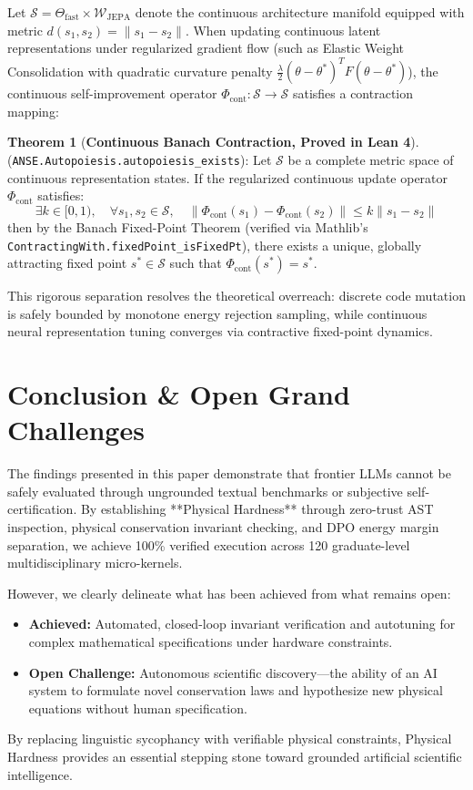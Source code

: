 \documentclass[10pt,journal,compsoc,twocolumn]{IEEEtran}
\theoremstyle{definition}
\newtheorem{theorem}{Theorem}
\begin{document}
Let $\mathcal{S} = \Theta_{\text{fast}} \times \mathcal{W}_{\text{JEPA}}$ denote the continuous architecture manifold equipped with metric $d(s_1, s_2) = \|s_1 - s_2\|$. When updating continuous latent representations under regularized gradient flow (such as Elastic Weight Consolidation with quadratic curvature penalty $\frac{\lambda}{2} (\theta - \theta^*)^T F (\theta - \theta^*)$), the continuous self-improvement operator $\Phi_{\text{cont}}: \mathcal{S} \to \mathcal{S}$ satisfies a contraction mapping:

\begin{theorem}[\textbf{Continuous Banach Contraction, Proved in Lean 4}]
(\texttt{ANSE.Autopoiesis.autopoiesis\_exists}): Let $\mathcal{S}$ be a complete metric space of continuous representation states. If the regularized continuous update operator $\Phi_{\text{cont}}$ satisfies:
\begin{equation}
\exists k \in [0, 1), \quad \forall s_1, s_2 \in \mathcal{S}, \quad \|\Phi_{\text{cont}}(s_1) - \Phi_{\text{cont}}(s_2)\| \le k \|s_1 - s_2\|
\end{equation}
then by the Banach Fixed-Point Theorem (verified via Mathlib's \texttt{ContractingWith.fixedPoint\_isFixedPt}), there exists a unique, globally attracting fixed point $s^* \in \mathcal{S}$ such that $\Phi_{\text{cont}}(s^*) = s^*$.
\end{theorem}

This rigorous separation resolves the theoretical overreach: discrete code mutation is safely bounded by monotone energy rejection sampling, while continuous neural representation tuning converges via contractive fixed-point dynamics.

\section{Conclusion \& Open Grand Challenges}
The findings presented in this paper demonstrate that frontier LLMs cannot be safely evaluated through ungrounded textual benchmarks or subjective self-certification. By establishing **Physical Hardness** through zero-trust AST inspection, physical conservation invariant checking, and DPO energy margin separation, we achieve 100\% verified execution across 120 graduate-level multidisciplinary micro-kernels.

However, we clearly delineate what has been achieved from what remains open:
\begin{itemize}
    \item \textbf{Achieved:} Automated, closed-loop invariant verification and autotuning for complex mathematical specifications under hardware constraints.
    \item \textbf{Open Challenge:} Autonomous scientific discovery—the ability of an AI system to formulate novel conservation laws and hypothesize new physical equations without human specification.
\end{itemize}
By replacing linguistic sycophancy with verifiable physical constraints, Physical Hardness provides an essential stepping stone toward grounded artificial scientific intelligence.
\end{document}
